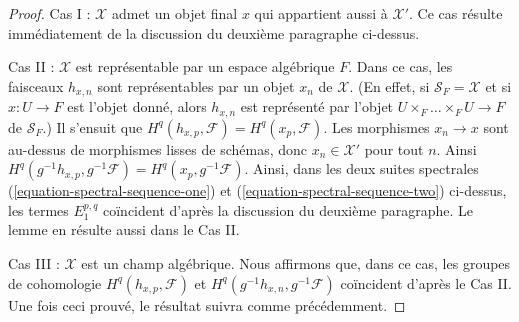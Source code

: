 \begin{proof}
\medskip\noindent
Cas I : $\mathcal{X}$ admet un objet final $x$ qui appartient aussi à
$\mathcal{X}'$. Ce cas résulte immédiatement de la discussion
du deuxième paragraphe ci-dessus.

\medskip\noindent
Cas II : $\mathcal{X}$ est représentable par un espace algébrique $F$.
Dans ce cas, les faisceaux $h_{x, n}$ sont représentables par un
objet $x_n$ de $\mathcal{X}$. (En effet, si $\mathcal{S}_F = \mathcal{X}$
et si $x : U \to F$ est l'objet donné, alors $h_{x, n}$ est représenté
par l'objet $U \times_F \ldots \times_F U \to F$ de $\mathcal{S}_F$.)
Il s'ensuit que $H^q(h_{x, p}, \mathcal{F}) = H^q(x_p, \mathcal{F})$.
Les morphismes $x_n \to x$ sont au-dessus de morphismes lisses de schémas, donc
$x_n \in \mathcal{X}'$ pour tout $n$. Ainsi
$H^q(g^{-1}h_{x, p}, g^{-1}\mathcal{F}) = H^q(x_p, g^{-1}\mathcal{F})$.
Ainsi, dans les deux suites spectrales
(\ref{equation-spectral-sequence-one}) et
(\ref{equation-spectral-sequence-two}) ci-dessus, les termes $E_1^{p, q}$ coïncident
d'après la discussion du deuxième paragraphe. Le lemme en résulte aussi
dans le Cas II.

\medskip\noindent
Cas III : $\mathcal{X}$ est un champ algébrique. Nous affirmons que, dans ce cas,
les groupes de cohomologie $H^q(h_{x, p}, \mathcal{F})$ et
$H^q(g^{-1}h_{x, n}, g^{-1}\mathcal{F})$ coïncident d'après le Cas II.
Une fois ceci prouvé, le résultat suivra comme précédemment.


\end{proof}
